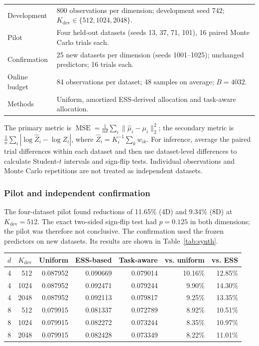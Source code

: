 \documentclass[10pt,letterpaper]{article}
\newcommand{\norm}[1]{\lVert #1\rVert_2}
\newcommand{\MSE}{\operatorname{MSE}}
\newcommand{\dev}{K_{\mathrm{dev}}}
\begin{document}
\begin{center}
\small
\begin{tabularx}{\linewidth}{@{}lY@{}}
\toprule
Development & 800 observations per dimension; development seed 742; $\dev\in\{512,1024,2048\}$.\\
Pilot & Four held-out datasets (seeds 13, 37, 71, 101), 16 paired Monte Carlo trials each.\\
Confirmation & 25 new datasets per dimension (seeds 1001--1025); unchanged predictors; 16 trials each.\\
Online budget & 84 observations per dataset; 48 samples on average; $B=4032$.\\
Methods & Uniform, amortized ESS-derived allocation and task-aware allocation.\\
\bottomrule
\end{tabularx}
\end{center}
The primary metric is $\MSE=\frac{1}{nd}\sum_i\norm{\widehat\mu_i-\mu_i}^2$; the secondary metric is $\frac1n\sum_i|\log\widehat Z_i-\log Z_i|$, where $\widehat Z_i=K_i^{-1}\sum_k w_{ik}$. For inference, average the paired trial differences within each dataset and then use dataset-level differences to calculate Student-$t$ intervals and sign-flip tests. Individual observations and Monte Carlo repetitions are not treated as independent datasets.
\subsubsection{Pilot and independent confirmation}
The four-dataset pilot found reductions of 11.65\% (4D) and 9.34\% (8D) at $\dev=512$. The exact two-sided sign-flip test had $p=0.125$ in both dimensions; the pilot was therefore not conclusive. The confirmation used the frozen predictors on new datasets. Its results are shown in Table~\ref{tab:synth}.
\begin{center}
\small
\begin{tabular}{@{}rr rrr rr@{}}
\toprule
$d$ & $\dev$ & Uniform & ESS-based & Task-aware & vs. uniform & vs. ESS\\
\midrule
4&512&0.087952&0.090669&0.079014&10.16\%&12.85\%\\
4&1024&0.087952&0.092471&0.079244&9.90\%&14.30\%\\
4&2048&0.087952&0.092113&0.079817&9.25\%&13.35\%\\
8&512&0.079915&0.081337&0.072789&8.92\%&10.51\%\\
8&1024&0.079915&0.082272&0.073244&8.35\%&10.97\%\\
8&2048&0.079915&0.082428&0.073349&8.22\%&11.01\%\\
\bottomrule
\end{tabular}
\label{tab:synth}
\end{center}
\end{document}
